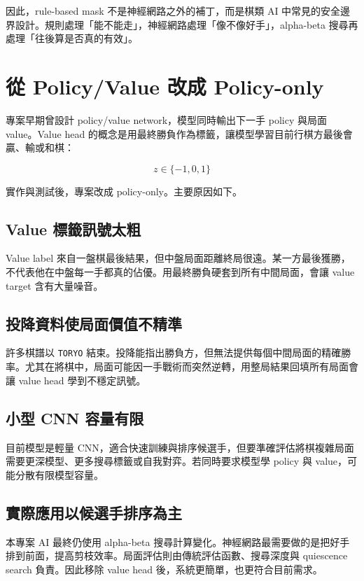 \documentclass[12pt,a4paper,fontset=none]{ctexart}
\begin{document}
因此，rule-based mask 不是神經網路之外的補丁，而是棋類 AI 中常見的安全邊界設計。規則處理「能不能走」，神經網路處理「像不像好手」，alpha-beta 搜尋再處理「往後算是否真的有效」。

\section{從 Policy/Value 改成 Policy-only}

專案早期曾設計 policy/value network，模型同時輸出下一手 policy 與局面 value。Value head 的概念是用最終勝負作為標籤，讓模型學習目前行棋方最後會贏、輸或和棋：

\[
z \in \{-1,0,1\}
\]

實作與測試後，專案改成 policy-only。主要原因如下。

\subsection{Value 標籤訊號太粗}

Value label 來自一盤棋最後結果，但中盤局面距離終局很遠。某一方最後獲勝，不代表他在中盤每一手都真的佔優。用最終勝負硬套到所有中間局面，會讓 value target 含有大量噪音。

\subsection{投降資料使局面價值不精準}

許多棋譜以 \texttt{TORYO} 結束。投降能指出勝負方，但無法提供每個中間局面的精確勝率。尤其在將棋中，局面可能因一手戰術而突然逆轉，用整局結果回填所有局面會讓 value head 學到不穩定訊號。

\subsection{小型 CNN 容量有限}

目前模型是輕量 CNN，適合快速訓練與排序候選手，但要準確評估將棋複雜局面需要更深模型、更多搜尋標籤或自我對弈。若同時要求模型學 policy 與 value，可能分散有限模型容量。

\subsection{實際應用以候選手排序為主}

本專案 AI 最終仍使用 alpha-beta 搜尋計算變化。神經網路最需要做的是把好手排到前面，提高剪枝效率。局面評估則由傳統評估函數、搜尋深度與 quiescence search 負責。因此移除 value head 後，系統更簡單，也更符合目前需求。
\end{document}
